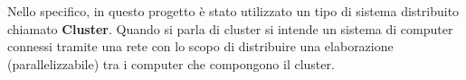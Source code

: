 Nello specifico, in questo progetto è stato utilizzato un tipo di sistema distribuito chiamato \textbf{Cluster}. Quando si parla di cluster si intende un sistema di computer connessi tramite una rete con lo scopo di distribuire una elaborazione (parallelizzabile) tra i computer che compongono il cluster.